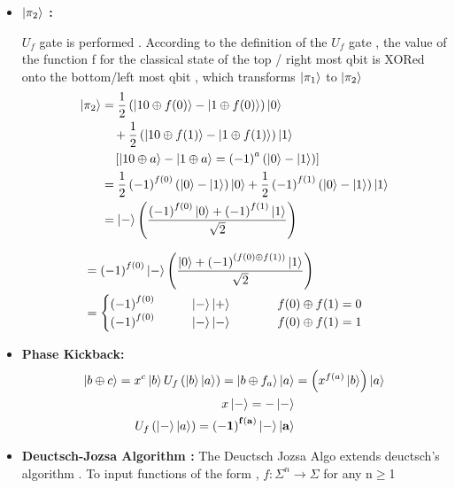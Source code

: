 \documentclass[12pt]{beamer}
\begin{document}
\begin{frame}
\begin{itemize}
\item\textbf {$ \ket {\pi_2} $ :}

$ U_f $ gate is performed . According to the definition of the $ U_f $ gate , the value of the function f for the classical state of the top / right most qbit is XORed onto the bottom/left most qbit , which transforms $ \ket { \pi_1} $ to $\ket { \pi_2}$
\begin{align*}
\ket{\pi_2} &= \frac{1}{2}\left(\ket{10\oplus f(0)} - \ket{1\oplus f(0)}\right)\ket{0} \\
&\quad + \frac{1}{2}\left(\ket{10\oplus f(1)} - \ket{1\oplus f(1)}\right)\ket{1} \\
&\quad \left[\ket{10\oplus a}-\ket{1\oplus a} = \left(-1\right)^a \left(\ket{0}-\ket{1}\right)\right] \\
&=\frac{1}{2}\left(-1\right)^{f(0)}\left(\ket{0}-\ket{1}\right)\ket{0}+\frac{1}{2}\left(-1\right)^{f(1)}\left(\ket{0}-\ket{1}\right)\ket{1}\\
&=\ket{-}\left(\frac{\left(-1\right)^{f(0)}\ket{0}+\left(-1\right)^{f(1)}\ket{1}}{\sqrt{2}}\right)
\end{align*}
\end{itemize}
\end{frame}
\begin{frame}
\begin{align*}
&=\left(-1\right)^{f(0)}\ket{-}\left(\frac{\ket{0}+\left(-1\right)^{\left(f(0)\oplus f(1)\right)}\ket{1}}{\sqrt{2}}\right) \\
&=
\begin{cases}
    \left(-1\right)^{f(0)}\hspace{1cm}\ket{-}\ket{+}\hspace{1cm}&f(0)\oplus f(1)=0  \\
    \left(-1\right)^{f(0)}\hspace{1cm}\ket{-}\ket{-}\hspace{1cm}&f(0)\oplus f(1)=1   \\
\end{cases}
\end{align*}
\begin{itemize}
\item \textbf{Phase Kickback:}
\begin{align*}
\ket{b\oplus c}=x^c\ket{b}
U_f\left(\ket{b}\ket{a}\right)=\ket{b\oplus f_a}\ket{a}
&=\left(x^{f(a)}\ket{b}\right)\ket{a} \\
x\ket{-}=-\ket{-} \\
U_f\left(\ket{-}\ket{a}\right)=\mathbf{\left(-1\right)^{f(a)}\ket{-}\ket{a}}
\end{align*}
\item\textbf {Deuctsch-Jozsa Algorithm :}
The Deuctsch Jozsa Algo extends deuctsch's algorithm . To input functions of the form ,
$f:\Sigma^n \rightarrow \Sigma$ for any n$\ge$1
\end{itemize}
\end{frame}
\end{document}
